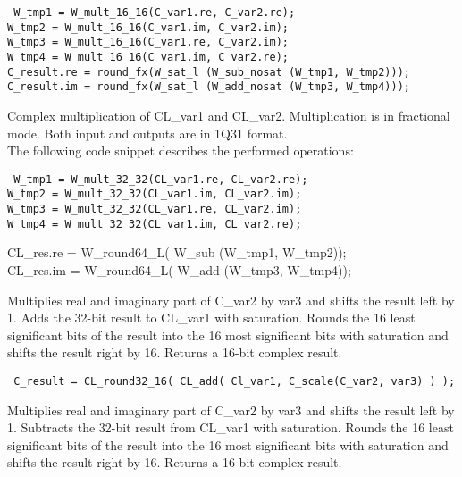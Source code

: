 {\tt {} W\_tmp1 = W\_mult\_16\_16(C\_var1.re, C\_var2.re);\\
 W\_tmp2 = W\_mult\_16\_16(C\_var1.im, C\_var2.im);\\
 W\_tmp3 = W\_mult\_16\_16(C\_var1.re, C\_var2.im);\\
 W\_tmp4 = W\_mult\_16\_16(C\_var1.im, C\_var2.re);\\

 C\_result.re = round\_fx(W\_sat\_l (W\_sub\_nosat (W\_tmp1, W\_tmp2)));\\
 C\_result.im = round\_fx(W\_sat\_l (W\_add\_nosat (W\_tmp3, W\_tmp4)));
}


Complex multiplication of CL\_var1 and CL\_var2.
Multiplication is in fractional mode. Both input and outputs are in 1Q31 format.\\
The following code snippet describes the performed operations:

{\tt {} W\_tmp1 = W\_mult\_32\_32(CL\_var1.re, CL\_var2.re);\\
 W\_tmp2 = W\_mult\_32\_32(CL\_var1.im, CL\_var2.im);\\
 W\_tmp3 = W\_mult\_32\_32(CL\_var1.re, CL\_var2.im);\\
 W\_tmp4 = W\_mult\_32\_32(CL\_var1.im, CL\_var2.re);

 CL\_res.re = W\_round64\_L( W\_sub (W\_tmp1, W\_tmp2));\\
 CL\_res.im = W\_round64\_L( W\_add (W\_tmp3, W\_tmp4));
}


Multiplies real and imaginary part of C\_var2 by var3 and shifts the result left by 1.
Adds the 32-bit result to CL\_var1 with saturation.
Rounds the 16 least significant bits of the result into the 16 most significant bits with saturation and shifts the result right by 16.
Returns a 16-bit complex result.

{\tt {} C\_result = CL\_round32\_16( CL\_add( Cl\_var1, C\_scale(C\_var2, var3) ) ); }


Multiplies real and imaginary part of C\_var2 by var3 and shifts the result left by 1.
Subtracts the 32-bit result from CL\_var1 with saturation. Rounds the 16 least significant bits of the result into the 16 most significant bits with saturation and shifts the result right by 16.
Returns a 16-bit complex result.

